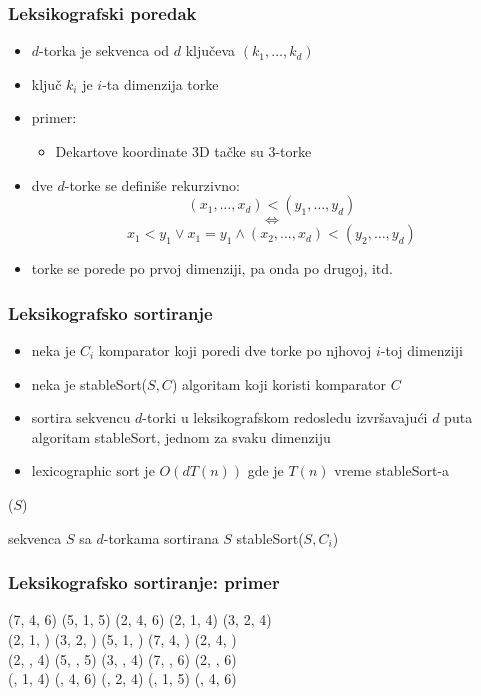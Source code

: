\documentclass[compress]{beamer}
\begin{document}
\begin{frame}
  \frametitle{Leksikografski poredak}
  \begin{itemize}
    \item $d$-torka je sekvenca od $d$ ključeva $(k_1,\ldots,k_d)$
    \item ključ $k_i$ je $i$-ta dimenzija torke
    \item primer:
    \begin{itemize}
      \item Dekartove koordinate 3D tačke su 3-torke
    \end{itemize}
    \item {} dve $d$-torke se definiše rekurzivno:
    $$(x_1,\ldots,x_d) < (y_1,\ldots,y_d) $$
    $$\Leftrightarrow$$ 
    $$x_1 < y_1 \lor x_1 = y_1 \land (x_2,\ldots,x_d)<(y_2,\ldots,y_d)$$
    \item torke se porede po prvoj dimenziji, pa onda po drugoj, itd.
  \end{itemize}
\end{frame}

\begin{frame}
  \frametitle{Leksikografsko sortiranje}
  \begin{itemize}
    \item neka je $C_i$ komparator koji poredi dve torke po njhovoj $i$-toj dimenziji
    \item neka je stableSort($S, C$) algoritam koji koristi komparator $C$
    \item {} sortira sekvencu $d$-torki u leksikografskom redosledu izvršavajući $d$ puta algoritam stableSort, jednom za svaku dimenziju
    \item lexicographic sort je $O(dT(n))$ gde je $T(n)$ vreme stableSort-a
  \end{itemize}
($S$)
\begin{algorithmic}
\REQUIRE sekvenca $S$ sa $d$-torkama
\ENSURE sortirana $S$
  \STATE stableSort($S, C_i$)
\ENDFOR
\end{algorithmic}
\end{frame}

\begin{frame}
  \frametitle{Leksikografsko sortiranje: primer}
(7, 4, 6) (5, 1, 5) (2, 4, 6) (2, 1, 4) (3, 2, 4) \\
(2, 1, ) (3, 2, ) (5, 1, ) (7, 4, ) (2, 4, ) \\
(2, , 4) (5, , 5) (3, , 4) (7, , 6) (2, , 6) \\
(, 1, 4) (, 4, 6) (, 2, 4) (, 1, 5) (, 4, 6)
\end{frame}
\end{document}
